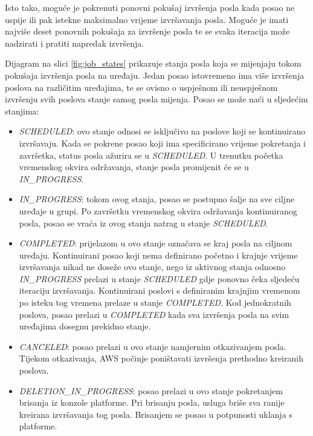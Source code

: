 Isto tako, moguće je pokrenuti ponovni pokušaj izvršenja posla kada posao ne uspije ili pak istekne maksimalno vrijeme izvršavanja posla. Moguće je imati najviše deset ponovnih pokušaja za izvršenje posla te se svaka iteracija može nadzirati i pratiti napredak izvršenja. 

Dijagram na slici \ref{fig:job_states} prikazuje stanja posla koja se mijenjaju tokom pokušaja izvršenja posla na uređaju. Jedan posao istovremeno ima više izvršenja poslova na različitim uređajima, te se ovisno o uspješnom ili neuspješnom izvršenju svih poslova stanje samog posla mijenja. Posao se može naći u sljedećim stanjima:
\begin{itemize}
	\item \textit{SCHEDULED}: ovo stanje odnosi se isključivo na poslove koji se kontinuirano izvršavaju. Kada se pokrene posao koji ima specificirano vrijeme pokretanja i završetka, status posla ažurira se u \textit{SCHEDULED}. U trenutku početka vremenskog okvira održavanja, stanje posla promijenit će se u \textit{IN\_PROGRESS}.
	\item \textit{IN\_PROGRESS}: tokom ovog stanja, posao se postupno šalje na sve ciljne uređaje u grupi. Po završetku vremenskog okvira održavanja kontinuiranog posla, posao se vraća iz ovog stanja natrag u stanje \textit{SCHEDULED}.
	\item \textit{COMPLETED}: prijelazom u ovo stanje označava se kraj posla na ciljnom uređaju. Kontinuirani posao koji nema definirano početno i krajnje vrijeme izvršavanja nikad ne doseže ovo stanje, nego iz aktivnog stanja odnosno \textit{IN\_PROGRESS} prelazi u stanje \textit{SCHEDULED} gdje ponovno čeka sljedeću iteraciju izvršavanja. Kontinuirani poslovi s definiranim krajnjim vremenom po isteku tog vremena prelaze u stanje \textit{COMPLETED}. Kod jednokratnih poslova, posao prelazi u \textit{COMPLETED} kada sva izvršenja posla na svim uređajima dosegnu prekidno stanje. 
	\item \textit{CANCELED}: posao prelazi u ovo stanje namjernim otkazivanjem posla. Tijekom otkazivanja, AWS počinje poništavati izvršenja prethodno kreiranih poslova.
	\item \textit{DELETION\_IN\_PROGRESS}: posao prelazi u ovo stanje pokretanjem brisanja iz konzole platforme. Pri brisanju posla, usluga briše sva ranije kreirana izvršavanja tog posla. Brisanjem se posao u potpunosti uklanja s platforme. 
\end{itemize}

